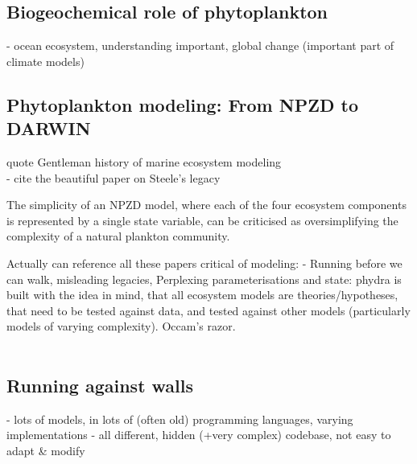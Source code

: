 \documentclass[template.tex]{subfiles}
\begin{document}
\introduction  %



\subsection{Biogeochemical role of phytoplankton}
- ocean ecosystem, understanding important, global change (important part of climate models)

\subsection{Phytoplankton modeling: From NPZD to DARWIN}
quote Gentleman history of marine ecosystem modeling
\\
- cite the beautiful paper on Steele's legacy
\citep{Anderson2019RememberingEcosystems}

The simplicity of an NPZD model, where each of the four ecosystem components is represented by a single state variable, can be criticised as oversimplifying the complexity of a natural plankton community.

Actually can reference all these papers critical of modeling:
- Running before we can walk, misleading legacies, Perplexing parameterisations
and state: phydra is built with the idea in mind, that all ecosystem models are theories/hypotheses, that need to be tested against data, and tested against other models (particularly models of varying complexity). Occam's razor. \\
\\


\subsection{Running against walls}

- lots of models, in lots of (often old) programming languages, varying implementations
- all different, hidden (+very complex) codebase, not easy to adapt \& modify
\end{document}

